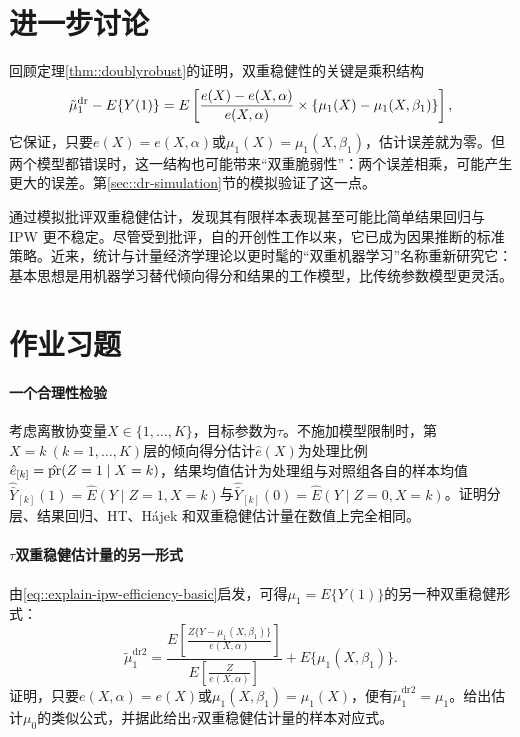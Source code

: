 \section{进一步讨论}



回顾定理\ref{thm::doublyrobust}的证明，双重稳健性的关键是乘积结构
$$
\tilde{\mu}_1^\textup{dr} - E\{  Y(1) \} 
= E\left[   \frac{e(X) - e(X,\alpha) }{  e(X,\alpha) }  \times  \left\{  \mu_1(X) -  \mu_1(X, \beta_1)   \right\} \right] ,
$$
它保证，只要$e(X) = e(X,\alpha) $或$ \mu_1(X) =  \mu_1(X, \beta_1) $，估计误差就为零。但两个模型都错误时，这一结构也可能带来“双重脆弱性”：两个误差相乘，可能产生更大的误差。第\ref{sec::dr-simulation}节的模拟验证了这一点。 


\citet{kang2007demystifying}通过模拟批评双重稳健估计，发现其有限样本表现甚至可能比简单结果回归与 IPW 更不稳定。尽管受到\citet{kang2007demystifying}批评，自\citet{scharfstein1999adjusting}的开创性工作以来，它已成为因果推断的标准策略。近来，统计与计量经济学理论以更时髦的“双重机器学习”名称重新研究它\citep{chernozhukov2018double}：基本思想是用机器学习替代倾向得分和结果的工作模型，比传统参数模型更灵活。 





\section{作业习题}



 \paragraph{一个合理性检验}\label{hw::discreteX-obs}
考虑离散协变量$X \in \{1, \ldots, K\}$，目标参数为$\tau$。不施加模型限制时，第$X=k\ (k=1, \ldots, K)$层的倾向得分估计$\hat{e}(X)$为处理比例$\hat{e}_{[k]} = \hat{\textup{pr}}(Z=1\mid X=k) $，结果均值估计为处理组与对照组各自的样本均值$\hat{\bar{Y}}_{[k]}(1)  = \hat{E}(Y\mid Z=1, X=k) $与$\hat{\bar{Y}}_{[k]}(0)  = \hat{E}(Y\mid Z=0, X=k) $。证明分层、结果回归、HT、Hájek 和双重稳健估计量在数值上完全相同。 
 


\paragraph{$\tau$双重稳健估计量的另一形式}\label{hw::alternative-dr2-robins}

由\eqref{eq::explain-ipw-efficiency-basic}启发，可得$\mu_1 = E\{ Y(1) \} $的另一种双重稳健形式：
$$
\tilde{\mu}_1^\text{dr2} = 
\frac{ E\left[   \frac{Z\{ Y-\mu_1(X,\beta_1) \}}{  e(X,\alpha) } \right] }{E\left[   \frac{Z }{  e(X,\alpha) } \right]} 
 + E\{ \mu_1(X, \beta_1)  \} .
$$
证明，只要$e(X,\alpha)  = e(X)$或$\mu_1(X, \beta_1) =  \mu_1(X)$，便有$\tilde{\mu}_1^\text{dr2} = \mu_1$。给出估计$\mu_0$的类似公式，并据此给出$\tau$双重稳健估计量的样本对应式。 

